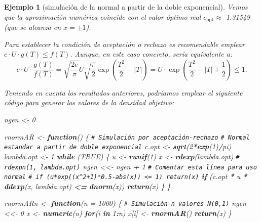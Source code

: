 \documentclass[
  spanish,
  10pt,
]{book}
\newenvironment{Shaded}{\begin{snugshade}}{\end{snugshade}}
\newcommand{\AttributeTok}[1]{\textcolor[rgb]{0.13,0.29,0.53}{#1}}
\newcommand{\CommentTok}[1]{\textcolor[rgb]{0.56,0.35,0.01}{\textit{#1}}}
\newcommand{\ConstantTok}[1]{\textcolor[rgb]{0.56,0.35,0.01}{#1}}
\newcommand{\ControlFlowTok}[1]{\textcolor[rgb]{0.13,0.29,0.53}{\textbf{#1}}}
\newcommand{\DecValTok}[1]{\textcolor[rgb]{0.00,0.00,0.81}{#1}}
\newcommand{\FunctionTok}[1]{\textcolor[rgb]{0.13,0.29,0.53}{\textbf{#1}}}
\newcommand{\NormalTok}[1]{#1}
\newcommand{\OtherTok}[1]{\textcolor[rgb]{0.56,0.35,0.01}{#1}}
\newcommand{\SpecialCharTok}[1]{\textcolor[rgb]{0.81,0.36,0.00}{\textbf{#1}}}
\theoremstyle{break}
\newtheorem{example}{Ejemplo}[chapter]
\theoremstyle{nonumberplain}
\renewcommand{\CommentTok}[1]{\textcolor[rgb]{0.41,0.41,0.41}{\texttt{#1}}}
\begin{document}
\begin{example}[simulación de la normal a partir de la doble exponencial]
Vemos que la aproximación numérica coincide con el valor óptimo real \(c_{\text{opt}} \approx\) 1.31549 (que se alcanza en \(x = \pm 1\)).

Para establecer la condición de aceptación o rechazo es recomendable emplear
\(c\cdot U\cdot g(T) \leq f(T)\).
Aunque, en este caso concreto, sería equivalente a:
\[c\cdot U\cdot\frac{g(T)  }{f(T)  }=\sqrt{\frac
{2e}{\pi}}U\sqrt{\frac{\pi}{2}}\exp\left( \frac{T^{2}}{2}-\left\vert
T\right\vert \right)  =U\cdot\exp\left( \frac{T^{2}}{2}-\left\vert
T\right\vert +\frac{1}{2}\right) \leq 1.\]

Teniendo en cuenta los resultados anteriores, podríamos emplear el siguiente código para generar los valores de la densidad objetivo:

\begin{Shaded}
\begin{Highlighting}[]
\NormalTok{ngen }\OtherTok{\textless{}{-}} \DecValTok{0}

\NormalTok{rnormAR }\OtherTok{\textless{}{-}} \ControlFlowTok{function}\NormalTok{() \{}
\CommentTok{\# Simulación por aceptación{-}rechazo}
\CommentTok{\# Normal estandar a partir de doble exponencial}
\NormalTok{  c.opt }\OtherTok{\textless{}{-}} \FunctionTok{sqrt}\NormalTok{(}\DecValTok{2}\SpecialCharTok{*}\FunctionTok{exp}\NormalTok{(}\DecValTok{1}\NormalTok{)}\SpecialCharTok{/}\NormalTok{pi)}
\NormalTok{  lambda.opt }\OtherTok{\textless{}{-}} \DecValTok{1}
  \ControlFlowTok{while}\NormalTok{ (}\ConstantTok{TRUE}\NormalTok{) \{}
\NormalTok{    u }\OtherTok{\textless{}{-}} \FunctionTok{runif}\NormalTok{(}\DecValTok{1}\NormalTok{)}
\NormalTok{    x }\OtherTok{\textless{}{-}} \FunctionTok{rdexp}\NormalTok{(lambda.opt) }\CommentTok{\# rdexpn(1, lambda.opt)}
\NormalTok{    ngen }\OtherTok{\textless{}\textless{}{-}}\NormalTok{ ngen }\SpecialCharTok{+} \DecValTok{1} \CommentTok{\# Comentar esta línea para uso normal}
    \CommentTok{\# if (u*exp((x\^{}2+1)*0.5{-}abs(x)) \textless{}= 1) return(x)}
    \ControlFlowTok{if}\NormalTok{ (c.opt }\SpecialCharTok{*}\NormalTok{ u }\SpecialCharTok{*} \FunctionTok{ddexp}\NormalTok{(x, lambda.opt) }\SpecialCharTok{\textless{}=} \FunctionTok{dnorm}\NormalTok{(x)) }\FunctionTok{return}\NormalTok{(x)}
\NormalTok{  \}}
\NormalTok{\}}

\NormalTok{rnormARn }\OtherTok{\textless{}{-}} \ControlFlowTok{function}\NormalTok{(}\AttributeTok{n =} \DecValTok{1000}\NormalTok{) \{}
\CommentTok{\# Simulación n valores N(0,1)}
\NormalTok{  ngen }\OtherTok{\textless{}\textless{}{-}} \DecValTok{0}
\NormalTok{  x }\OtherTok{\textless{}{-}} \FunctionTok{numeric}\NormalTok{(n)}
  \ControlFlowTok{for}\NormalTok{(i }\ControlFlowTok{in} \DecValTok{1}\SpecialCharTok{:}\NormalTok{n) x[i] }\OtherTok{\textless{}{-}} \FunctionTok{rnormAR}\NormalTok{()}
  \FunctionTok{return}\NormalTok{(x)}
\NormalTok{\}}
\end{Highlighting}
\end{Shaded}


\end{example}
\end{document}
